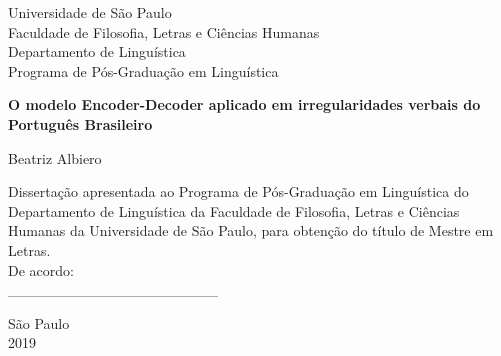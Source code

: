 \thispagestyle{empty}

\begin{center}
    Universidade de São Paulo\\
    Faculdade de Filosofia, Letras e Ciências Humanas\\
    Departamento de Linguística\\
    Programa de Pós-Graduação em Linguística 
\end{center}
\begin{center}
    \vspace*{1.3cm}
    \textbf{\Large{O modelo Encoder-Decoder aplicado em irregularidades verbais do Português Brasileiro
}}\\
\end{center}
\vspace{1.0 cm}

\begin{center}
\Large{Beatriz Albiero}
\end{center}

\vspace*{4.3cm}  
\hfill\begin{minipage}{0.5\linewidth}
  Dissertação apresentada ao Programa de Pós-Graduação em Linguística do Departamento de Linguística da Faculdade de Filosofia, Letras e Ciências Humanas da Universidade de São Paulo, para obtenção do título de Mestre em Letras. \\
  
  De acordo:\\
  
\_\_\_\_\_\_\_\_\_\_\_\_\_\_\_\_\_\_\_\_
  
 
\end{minipage}

 \begin{center}   
    \vskip 5.5cm
    \normalsize{São Paulo\\ 2019}
\end{center}